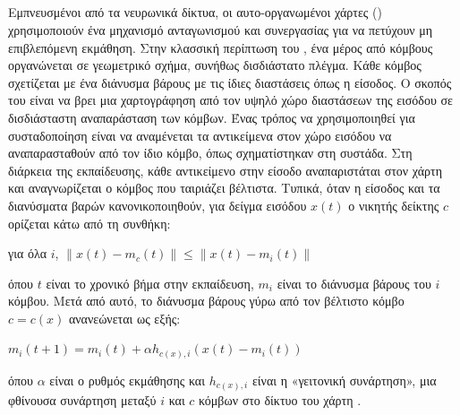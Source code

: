\subsection{}
Εμπνευσμένοι από τα νευρωνικά δίκτυα, οι αυτο-οργανωμένοι χάρτες () χρησιμοποιούν ένα μηχανισμό ανταγωνισμού και συνεργασίας για να πετύχουν μη επιβλεπόμενη εκμάθηση.  Στην κλασσική περίπτωση του , ένα μέρος από κόμβους οργανώνεται σε γεωμετρικό σχήμα, συνήθως δισδιάστατο πλέγμα. Κάθε κόμβος σχετίζεται με ένα διάνυσμα βάρους με τις ίδιες διαστάσεις όπως η είσοδος. Ο σκοπός του  είναι να βρει μια χαρτογράφηση από τον υψηλό χώρο διαστάσεων της εισόδου σε δισδιάσταστη αναπαράσταση των κόμβων. Ένας τρόπος να χρησιμοποιηθεί για συσταδοποίηση είναι να αναμένεται τα αντικείμενα στον χώρο εισόδου να αναπαρασταθούν από τον ίδιο κόμβο, όπως σχηματίστηκαν στη συστάδα. Στη διάρκεια της εκπαίδευσης, κάθε αντικείμενο στην είσοδο αναπαριστάται στον χάρτη και αναγνωρίζεται ο κόμβος που ταιριάζει βέλτιστα. Τυπικά, όταν η είσοδος και τα διανύσματα βαρών κανονικοποιηθούν, για δείγμα εισόδου $x(t)$ ο νικητής δείκτης $c$ ορίζεται κάτω από τη συνθήκη:
\begin{center}
για όλα $i$, $\|x(t)-m_c(t)\| \leq \|x(t)-m_i(t)\|$
\end{center}
όπου $t$ είναι το χρονικό βήμα στην εκπαίδευση, $m_i$ είναι το διάνυσμα βάρους του $i$ κόμβου. Μετά από αυτό, το διάνυσμα βάρους γύρω από τον βέλτιστο κόμβο $c=c(x)$ ανανεώνεται ως εξής:
\begin{center}
 $m_i(t+1)=m_i(t)+\alpha h_{c(x),i}(x(t)-m_i(t))$
\end{center}
όπου $\alpha$ είναι ο ρυθμός εκμάθησης και $h_{c(x),i}$ είναι η «γειτονική συνάρτηση», μια φθίνουσα συνάρτηση μεταξύ $i$ και $c$ κόμβων στο δίκτυο του χάρτη \cite{clustercomparison}.
